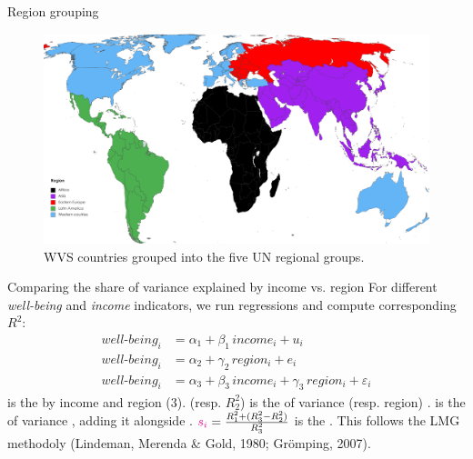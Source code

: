 \documentclass[aspectratio=169,xcolor=dvipsnames, 11pt,mathserif]{beamer}
\begin{document}
\begin{frame}{Region grouping}
    \begin{figure}
        \caption{WVS countries grouped into the five UN regional groups.}  
        \centering \includegraphics[height=.8\textheight]{../figures/region_groupings} %
    \end{figure}
\end{frame}

\begin{frame}{Comparing the share of variance explained by income vs. region}
    \bbvsp
    \ip For different \textit{well-being} and \textit{income} indicators, we run regressions and compute corresponding $R^2$:
    \begin{align} 
        well\text{-}being_i &= \alpha_1 + \beta_1\, income_i + u_i\\
        well\text{-}being_i &= \alpha_2 + \gamma_2\, region_i + e_i\\
        well\text{-}being_i &= \alpha_3 + \beta_3\, income_i + \gamma_3\, region_i + \varepsilon_i 
    \end{align} %
    \ip {} is the  by income and region (3).
    \ip {} (resp. $R^2_2$) is the  of variance  (resp. region) .
    \ip {} is the  of variance ,  adding it alongside . %
    \ip $\textcolor{magenta}{s_i} = \frac{R^2_1 + (R^2_3-R^2_2)}{R^2_3}$ is the .
    \ip This follows the LMG methodoly (Lindeman, Merenda \& Gold, 1980; Grömping, 2007).
    \ee
\end{frame} %
              
\end{document}
